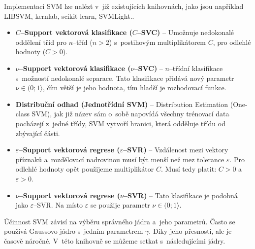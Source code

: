 Implementaci SVM lze nalézt v~již existujících knihovnách, jako jsou například LIBSVM, kernlab, scikit-learn, SVMLight..
\begin{itemize}
    \item\textbf{$C$--Support vektorová klasifikace ($C$--SVC)} --
          Umožnuje nedokonalé oddělení tříd pro $n$--tříd ($n > 2$) s~postihovým multiplikátorem $C$, pro odlehlé hodnoty ($C > 0$).
    \item\textbf{$\nu$--Support vektorová klasifikace ($\nu$--SVC)} --
          $n$--třídní klasifikace s~možností nedokonalé separace. Tato klasifikace přidává nový parametr $\nu \in (0;1\rangle$, čím větší je jeho hodnota, tím hladší je rozhodovací funkce.
    \item\textbf{Distribuční odhad (Jednotřídní SVM)} --
          Distribution Estimation (One-class SVM), jak již název sám o~sobě napovídá všechny trénovací data pocházejí z~jedné třídy, SVM vytvoří hranici, která odděluje třídu od zbývající části.
    \item\textbf{$\varepsilon$--Support vektorová regrese ($\varepsilon$--SVR)} --
          Vzdálenost mezi vektory příznaků a~rozdělovací nadrovinou musí být menší než mez tolerance $\varepsilon$. Pro odlehlé hodnoty opět použijeme multiplikátor $C$. Musí tedy platit: $C > 0$ a~$\varepsilon > 0$.
    \item\textbf{$\nu$--Support vektorová regrese ($\nu$--SVR)} --
          Tato klasifikace je podobná jako $\varepsilon$--SVR. Na místo $\varepsilon$ se použije parametr $\nu \in (0;1\rangle$.
\end{itemize}
Účinnost SVM závisí na výběru správného jádra a~jeho parametrů. Často se používá Gaussovo jádro s~jedním parametrem $\gamma$. Díky jeho přesnosti, ale je časově náročné. V~této knihovně se můžeme setkat s~následujícími jádry.
